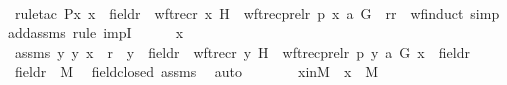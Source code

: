 \begin{isabellebody}
\ \ \isamarkupfalse%
\ {\isacharparenleft}{\kern0pt}rule{\isacharunderscore}{\kern0pt}tac\ P{\isacharequal}{\kern0pt}{\isachardoublequoteopen}{\isasymlambda}x{\isachardot}{\kern0pt}\ x\ {\isasymin}\ field{\isacharparenleft}{\kern0pt}r{\isacharparenright}{\kern0pt}\ {\isasymlongrightarrow}\ wftrec{\isacharparenleft}{\kern0pt}r{\isacharcomma}{\kern0pt}\ x{\isacharcomma}{\kern0pt}\ H{\isacharparenright}{\kern0pt}\ {\isacharequal}{\kern0pt}\ wftrec{\isacharparenleft}{\kern0pt}prel{\isacharparenleft}{\kern0pt}r{\isacharcomma}{\kern0pt}\ p{\isacharparenright}{\kern0pt}{\isacharcomma}{\kern0pt}\ {\isacharless}{\kern0pt}x{\isacharcomma}{\kern0pt}\ a{\isachargreater}{\kern0pt}{\isacharcomma}{\kern0pt}\ G{\isacharparenright}{\kern0pt}{\isachardoublequoteclose}\ \ r{\isacharequal}{\kern0pt}r\ \ wf{\isacharunderscore}{\kern0pt}induct{\isacharcomma}{\kern0pt}\ simp\ add{\isacharcolon}{\kern0pt}assms{\isacharcomma}{\kern0pt}\ rule\ impI{\isacharparenright}{\kern0pt}\isanewline
\ \ \ \ \isamarkupfalse%
\ x\ \isanewline
\ \ \ \ \isamarkupfalse%
\ assms{}{\isacharcolon}{\kern0pt}\ {\isachardoublequoteopen}{\isacharparenleft}{\kern0pt}{\isasymAnd}y{\isachardot}{\kern0pt}\ {\isasymlangle}y{\isacharcomma}{\kern0pt}\ x{\isasymrangle}\ {\isasymin}\ r\ {\isasymLongrightarrow}\ y\ {\isasymin}\ field{\isacharparenleft}{\kern0pt}r{\isacharparenright}{\kern0pt}\ {\isasymlongrightarrow}\ wftrec{\isacharparenleft}{\kern0pt}r{\isacharcomma}{\kern0pt}\ y{\isacharcomma}{\kern0pt}\ H{\isacharparenright}{\kern0pt}\ {\isacharequal}{\kern0pt}\ wftrec{\isacharparenleft}{\kern0pt}prel{\isacharparenleft}{\kern0pt}r{\isacharcomma}{\kern0pt}\ p{\isacharparenright}{\kern0pt}{\isacharcomma}{\kern0pt}\ {\isasymlangle}y{\isacharcomma}{\kern0pt}\ a{\isasymrangle}{\isacharcomma}{\kern0pt}\ G{\isacharparenright}{\kern0pt}{\isacharparenright}{\kern0pt}{\isachardoublequoteclose}\ {\isachardoublequoteopen}x\ {\isasymin}\ field{\isacharparenleft}{\kern0pt}r{\isacharparenright}{\kern0pt}{\isachardoublequoteclose}\ \isanewline
\isanewline
\ \ \ \ \isamarkupfalse%
\ {\isachardoublequoteopen}field{\isacharparenleft}{\kern0pt}r{\isacharparenright}{\kern0pt}\ {\isasymin}\ M{\isachardoublequoteclose}\ \isamarkupfalse%
\ field{\isacharunderscore}{\kern0pt}closed\ assms\ \isamarkupfalse%
\ auto\isanewline
\ \ \ \ \isamarkupfalse%
\ \isamarkupfalse%
\ xinM\ {\isacharcolon}{\kern0pt}\ {\isachardoublequoteopen}x\ {\isasymin}\ M{\isachardoublequoteclose}\ \isamarkupfalse%

\end{isabellebody}
